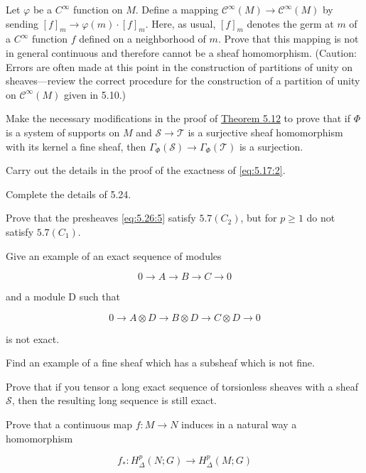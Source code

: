\begin{problemset}
\item Let $\varphi$ be a $C^{\infty}$ function on $M$. Define a mapping $\mathcal{C}^{\infty}(M) \to \mathcal{C}^{\infty}(M)$ by sending $[f]_{m} \to \varphi(m) \cdot [f]_{m}$. Here, as usual, $[f]_{m}$ denotes the germ at $m$ of a $C^{\infty}$ function $f$ defined on a neighborhood of $m$. Prove that this mapping is not in general continuous and therefore cannot be a sheaf homomorphism. (Caution: Errors are often made at this point in the construction of partitions of unity on sheaves—review the correct procedure for the construction of a partition of unity on $\mathcal{C}^{\infty}(M)$ given in 5.10.)

\item Make the necessary modifications in the proof of \hyperref[thm:5.12]{Theorem 5.12} to prove that if $\Phi$ is a system of supports on $M$ and $\mathcal{S}\to\mathcal{T}$ is a surjective sheaf homomorphism with its kernel a fine sheaf, then $\Gamma_{\Phi}(\mathcal{S})\to\Gamma_{\Phi}(\mathcal{T})$ is a surjection.

\item Carry out the details in the proof of the exactness of \eqref{eq:5.17:2}.

\item Complete the details of 5.24.

\item Prove that the presheaves \eqref{eq:5.26:5} satisfy $5.7(C_2)$, but for $p\geq1$ do not satisfy $5.7(C_1)$.

\item Give an example of an exact sequence of modules

\[
0\to A\to B\to C\to0
\]

and a module D such that

\[
0\to A\otimes D\to B\otimes D\to C\otimes D\to0
\]

is not exact.

\item Find an example of a fine sheaf which has a subsheaf which is not fine.

\item Prove that if you tensor a long exact sequence of torsionless sheaves with a sheaf $\mathcal{S}$, then the resulting long sequence is still exact.

\item Prove that a continuous map $f\colon M\to N$ induces in a natural way a homomorphism

\[
f_{*}\colon H_{\Delta}^{p}(N;G)\to H_{\Delta}^{p}(M;G)
\]


\end{problemset}
